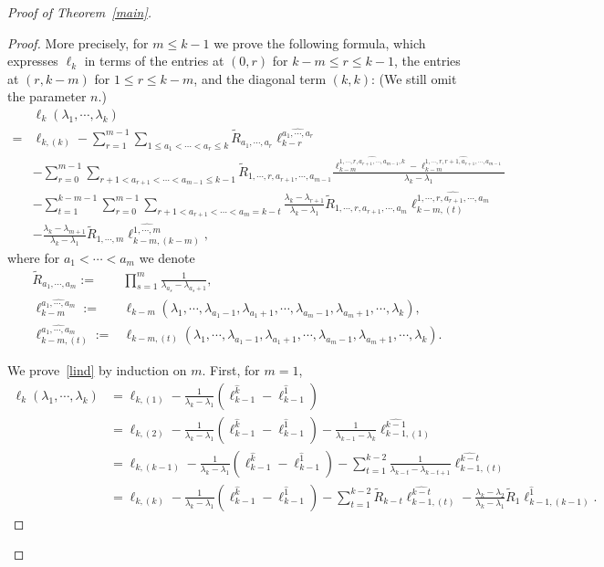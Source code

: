 \documentclass[a4paper]{article}
\theoremstyle{plain}
\theoremstyle{definition}
\newcommand{\nn}{\nonumber}
\begin{document}
\begin{proof}[Proof of Theorem~\ref{main}]
\begin{proof}
	More precisely, for $m\le k-1$ we prove the following formula, which expresses $\ell_k$ in terms of the entries at $(0,r)$ for $k-m\le r\le k-1$, the entries at $(r,k-m)$ for $1\le r\le k-m$, and the diagonal term $(k,k)$: (We still omit the parameter $n$.)
	\begin{align}
		&\ell_k(\lambda_1,\cdots,\lambda_k)\nn \\
		=& \ell_{k,(k)}-\sum_{r=1}^{m-1}\sum_{1\le a_1<\cdots<a_r\le k}\widetilde R_{a_1,\cdots,a_r}\ell_{k-r}^{\widehat{a_1,\cdots,a_r}} \nn\\
		& -\sum_{r=0}^{m-1}\sum_{r+1<a_{r+1}<\cdots<a_{m-1}\le k-1}\widetilde R_{1,\cdots,r,a_{r+1},\cdots,a_{m-1}}\frac{\ell_{k-m}^{\widehat{1,\cdots,r,a_{r+1},\cdots,a_{m-1},k}}-\ell_{k-m}^{\widehat{1,\cdots,r,r+1,a_{r+1},\cdots,a_{m-1}}}}{\lambda_k-\lambda_1} \nn\\
		& -\sum_{t=1}^{k-m-1}\sum_{r=0}^{m-1}\sum_{r+1<a_{r+1}<\cdots<a_m=k-t} \frac{\lambda_k-\lambda_{r+1}}{\lambda_k-\lambda_1}\widetilde R_{1,\cdots,r,a_{r+1},\cdots,a_m}\ell_{k-m,(t)}^{\widehat{1,\cdots,r,a_{r+1},\cdots,a_m}}\nn\\
		&-\frac{\lambda_k-\lambda_{m+1}}{\lambda_k-\lambda_1}\widetilde R_{1,\cdots,m}\ell_{k-m,(k-m)}^{\widehat{1,\cdots,m}}, \label{lind}
	\end{align}
	where for $a_{1}<\cdots<a_{m}$ we denote
	\begin{align}
		\widetilde R_{a_1,\cdots,a_m}:=& \prod_{s=1}^{m}\frac{1}{\lambda_{a_s}-\lambda_{a_s+1}}, \\
		\ell_{k-m}^{\widehat{a_1,\cdots,a_m}} :=& \ell_{k-m}(\lambda_1,\cdots,\lambda_{a_1-1},\lambda_{a_1+1},\cdots,\lambda_{a_m-1},\lambda_{a_m+1},\cdots,\lambda_k), \\
		\ell_{k-m,(t)}^{\widehat{a_1,\cdots,a_m}} :=& \ell_{k-m,(t)}(\lambda_1,\cdots,\lambda_{a_1-1},\lambda_{a_1+1},\cdots,\lambda_{a_m-1},\lambda_{a_m+1},\cdots,\lambda_k).
	\end{align}
	
	We prove~\eqref{lind} by induction on $m$. First, for $m=1$,
	\begin{align}
		\ell_{k}(\lambda_1,\cdots,\lambda_k) &= \ell_{k,(1)}-\frac{1}{\lambda_k-\lambda_1}(\ell_{k-1}^{\widehat k}-\ell_{k-1}^{\widehat1}) \nn\\
		&= \ell_{k,(2)}-\frac{1}{\lambda_k-\lambda_1}(\ell_{k-1}^{\widehat k}-\ell_{k-1}^{\widehat1})-\frac{1}{\lambda_{k-1}-\lambda_k}\ell_{k-1,(1)}^{\widehat{k-1}} \nn\\
		&= \ell_{k,(k-1)}-\frac{1}{\lambda_k-\lambda_1}(\ell_{k-1}^{\widehat k}-\ell_{k-1}^{\widehat1})-\sum_{t=1}^{k-2}\frac{1}{\lambda_{k-t}-\lambda_{k-t+1}}\ell_{k-1,(t)}^{\widehat{k-t}} \nn\\
		&= \ell_{k,(k)}-\frac{1}{\lambda_k-\lambda_1}(\ell_{k-1}^{\widehat k}-\ell_{k-1}^{\widehat1})-\sum_{t=1}^{k-2}\widetilde R_{k-t}\ell_{k-1,(t)}^{\widehat{k-t}} -\frac{\lambda_k-\lambda_2}{\lambda_k-\lambda_1}\widetilde R_1\ell_{k-1,(k-1)}^{\widehat1}.
	\end{align}
	

\end{proof}
\end{proof}
\end{document}
